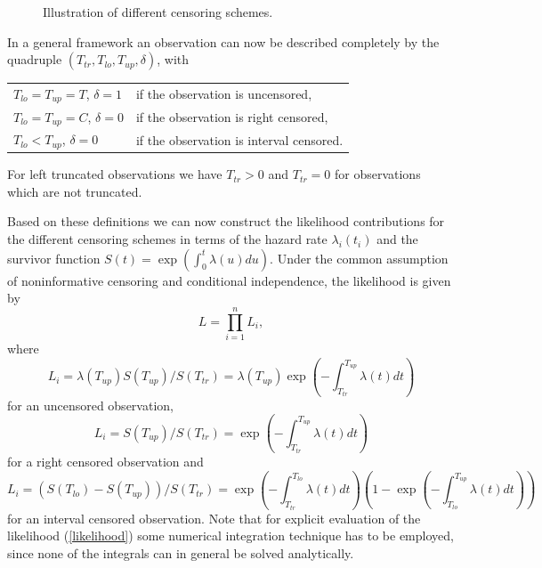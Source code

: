 \documentclass[11pt,a4paper,twoside]{bayesxarticle}
\begin{document}
\begin{figure}[htb]
\begin{center}
{\it\caption{Illustration of different censoring
schemes.\label{censoringschemes}}}
\end{center}
\end{figure}

In a general framework an observation can now be described
completely by the quadruple $(T_{tr},T_{lo},T_{up},\delta)$, with
\begin{center}
\begin{tabular}{ll}
$T_{lo}=T_{up}=T$, $\delta=1$ & if the observation is uncensored,\\
$T_{lo}=T_{up}=C$, $\delta=0$ & if the observation is right censored,\\
$T_{lo}<T_{up}$, $\delta=0$ & if the observation is interval censored.\\
\end{tabular}
\end{center}
For left truncated observations we have $T_{tr}>0$ and $T_{tr}=0$
for observations which are not truncated.

Based on these definitions we can now construct the likelihood
contributions for the different censoring schemes in terms of the
hazard rate $\lambda_i(t_i)$ and the survivor function
$S(t)=\exp(\int_0^t\lambda(u)du)$. Under the common assumption of
noninformative censoring and conditional independence, the
likelihood is given by
\begin{equation}\label{likelihood}
 L=\prod_{i=1}^n L_i,
\end{equation}
where
\[L_i = \lambda(T_{up})S(T_{up})/S(T_{tr}) = \lambda(T_{up})\exp\left(-\int_{T_{tr}}^{T_{up}}\lambda(t)dt\right)\]
for an uncensored observation,
\[L_i = S(T_{up})/S(T_{tr}) = \exp\left(-\int_{T_{tr}}^{T_{up}}\lambda(t)dt\right)\]
for a right censored observation and
\[L_i = (S(T_{lo})-S(T_{up}))/S(T_{tr}) = \exp\left(-\int_{T_{tr}}^{T_{lo}}\lambda(t)dt\right)\left(1-\exp\left(-\int_{T_{lo}}^{T_{up}}\lambda(t)dt\right)\right)\]
for an interval censored observation. Note that for explicit
evaluation of the likelihood (\ref{likelihood}) some numerical
integration technique has to be employed, since none of the
integrals can in general be solved analytically.
\end{document}

